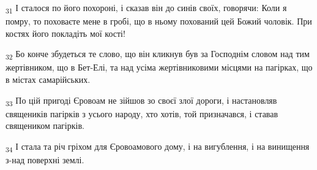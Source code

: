\begin{tcolorbox}
\textsubscript{31} І сталося по його похороні, і сказав він до синів своїх, говорячи: Коли я помру, то поховаєте мене в гробі, що в ньому похований цей Божий чоловік. При костях його покладіть мої кості!
\end{tcolorbox}
\begin{tcolorbox}
\textsubscript{32} Бо конче збудеться те слово, що він кликнув був за Господнім словом над тим жертівником, що в Бет-Елі, та над усіма жертівниковими місцями на пагірках, що в містах самарійських.
\end{tcolorbox}
\begin{tcolorbox}
\textsubscript{33} По цій пригоді Єровоам не зійшов зо своєї злої дороги, і настановляв священиків пагірків з усього народу, хто хотів, той призначався, і ставав священиком пагірків.
\end{tcolorbox}
\begin{tcolorbox}
\textsubscript{34} І стала та річ гріхом для Єровоамового дому, і на вигублення, і на винищення з-над поверхні землі.
\end{tcolorbox}
